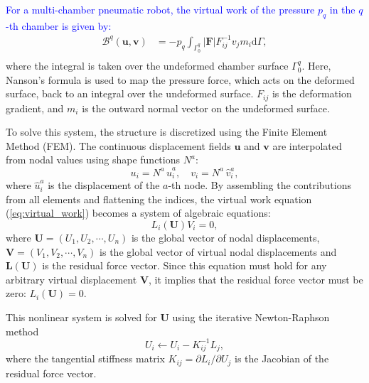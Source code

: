\documentclass[journal]{IEEEtran}
\theoremstyle{definition}
\begin{document}
\textcolor{blue}{For a multi-chamber pneumatic robot, the virtual work of the pressure $p_q$ in the $q$-th chamber is given by:}
\begin{equation}
  \begin{split}
    \mathcal{B}^q\left(\mathbf{u}, \mathbf{v}\right) &= - p_q\int_{\Gamma^q_0} \left|\mathbf{F}\right| F_{ij}^{-1} v_j m_i \mathrm{d}\Gamma,\\[1mm]
  \end{split}
  \label{eq:load_weak_form}
\end{equation}
where the integral is taken over the undeformed chamber surface $\Gamma^q_0$. Here, Nanson's formula is used to map the pressure force, which acts on the deformed surface, back to an integral over the undeformed surface. $F_{ij}$ is the deformation gradient, and $m_i$ is the outward normal vector on the undeformed surface.

To solve this system, the structure is discretized using the Finite Element Method (FEM). The continuous displacement fields $\mathbf{u}$ and $\mathbf{v}$ are interpolated from nodal values using shape functions $N^a$:
\begin{equation}
  u_i = N^a\,\hat{u}^a_i,\quad v_i = N^a\,\hat{v}^a_i,
\end{equation}
where $\hat{u}^a_i$ is the displacement of the $a$-th node. By assembling the contributions from all elements and flattening the indices, the virtual work equation (\ref{eq:virtual_work}) becomes a system of algebraic equations:
\begin{equation}
  L_i \left(\mathbf{U}\right) V_i = 0,
  \label{eq:virtual_work_discrete}
\end{equation}
where $\mathbf{U}=\left(U_1,U_2,\cdots, U_n\right)$ is the global vector of nodal displacements, $\mathbf{V}=\left(V_1,V_2,\cdots, V_n\right)$ is the global vector of virtual nodal displacements and $\mathbf{L}(\mathbf{U})$ is the residual force vector. Since this equation must hold for any arbitrary virtual displacement $\mathbf{V}$, it implies that the residual force vector must be zero: $L_i(\mathbf{U}) = 0$.

This nonlinear system is solved for $\mathbf{U}$ using the iterative Newton-Raphson method
\begin{equation}
  U_i \leftarrow U_i - K^{-1}_{ij} L_j,
\end{equation}
where the tangential stiffness matrix $K_{ij} = \partial L_i/\partial U_j$ is the Jacobian of the residual force vector.
\end{document}
